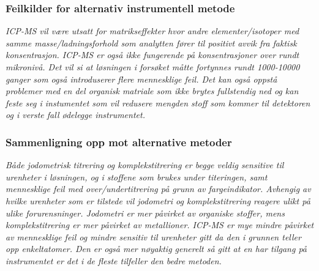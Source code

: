\subsubsection{Feilkilder for alternativ instrumentell metode}
\textit{ICP-MS vil være utsatt for matrikseffekter hvor andre elementer/isotoper med samme masse/ladningsforhold som analytten fører til positivt avvik fra faktisk konsentrasjon\cite{ICPMSGeneral2}. ICP-MS er også ikke fungerende på konsentrasjoner over rundt mikronivå\cite{ICPMSGeneral2}\cite{ICPMSGeneral}. Det vil si at løsningen i forsøket måtte fortynnes rundt 1000-10000 ganger som også introduserer flere mennesklige feil. Det kan også oppstå problemer med en del organisk matriale som ikke brytes fullstendig ned og kan feste seg i instumentet som vil redusere mengden stoff som kommer til detektoren og i verste fall ødelegge instrumentet.}

\subsubsection{Sammenligning opp mot alternative metoder}
\textit{Både jodometrisk titrering og komplekstitrering er begge veldig sensitive til urenheter i løsningen, og i stoffene som brukes under titeringen, samt mennesklige feil med over/undertitrering på grunn av fargeindikator. Avhengig av hvilke urenheter som er tilstede vil jodometri og komplekstitrering reagere ulikt på ulike forurensninger. Jodometri er mer påvirket av organiske stoffer, mens komplekstitrering er mer påvirket av metallioner. ICP-MS er mye mindre påvirket av mennesklige feil og mindre sensitiv til urenheter gitt da den i grunnen teller opp enkeltatomer. Den er også mer nøyaktig generelt så gitt at en har tilgang på instrumentet er det i de fleste tilfeller den bedre metoden.}
